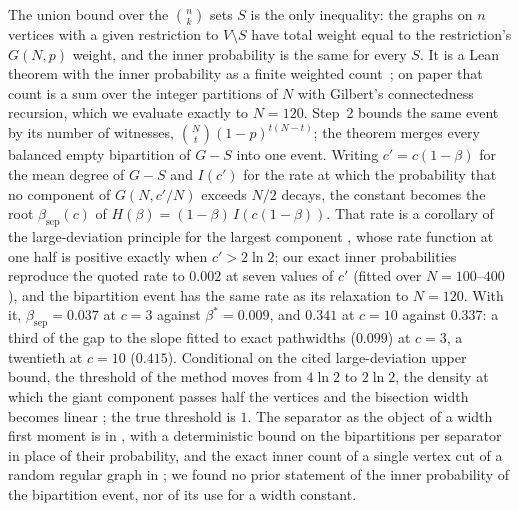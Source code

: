 The union bound over the $\binom nk$ sets $S$ is the only inequality: the
graphs on $n$ vertices with a given restriction to $V\setminus S$ have total
weight equal to the restriction's $G(N,p)$ weight, and the inner probability
is the same for every $S$. It is a Lean theorem with the inner probability as a
finite weighted count~; on paper that count is a sum over the
integer partitions of $N$ with Gilbert's connectedness recursion, which we
evaluate exactly to $N=120$. Step~2 bounds the same event by its number of
witnesses, $\binom Nt(1-p)^{t(N-t)}$; the theorem merges every balanced empty
bipartition of $G-S$ into one event. Writing $c'=c(1-\beta)$ for the mean
degree of $G-S$ and $I(c')$ for the rate at which the probability that no
component of $G(N,c'/N)$ exceeds $N/2$ decays, the constant becomes the root
$\beta_{\mathrm{sep}}(c)$ of $H(\beta)=(1-\beta)\,I(c(1-\beta))$. That rate is a corollary of the
large-deviation principle for the largest component
\citep{OConnell1998,Puhalskii2005,AndreisKonigPatterson2021}, whose rate
function at one half is positive exactly when $c'>2\ln2$; our exact inner
probabilities reproduce the quoted rate to $0.002$ at seven values of $c'$
(fitted over $N=100$--$400$), and the bipartition event has the same rate as
its relaxation to $N=120$. With it, $\beta_{\mathrm{sep}}=0.037$ at $c=3$
against $\beta^{*}=0.009$, and $0.341$ at $c=10$ against $0.337$: a third of
the gap to the slope fitted to exact pathwidths ($0.099$) at $c=3$, a
twentieth at $c=10$ ($0.415$). Conditional on the cited large-deviation upper
bound, the threshold of the method moves from $4\ln2$ to $2\ln2$, the density
at which the giant component passes half the vertices and the bisection width
becomes linear \citep{LuczakMcDiarmid2001}; the true threshold is $1$. The
separator as the object of a width first moment is in \citet{DoErdeKang2024},
with a deterministic bound on the bipartitions per separator in place of their
probability, and the exact inner count of a single vertex cut of a random
regular graph in \citet{KolesnikWormald2014}; we found no prior statement of
the inner probability of the bipartition event, nor of its use for a width
constant.

